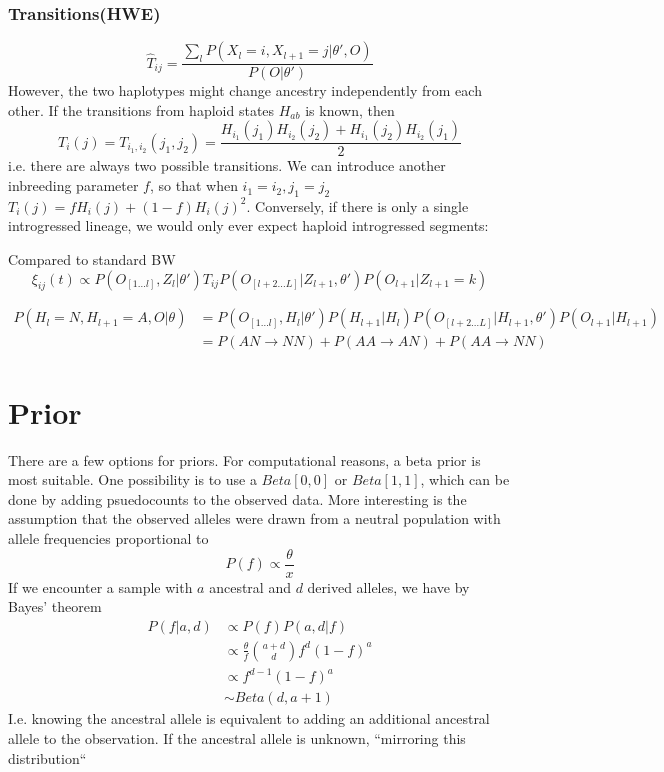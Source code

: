 \documentclass[10pt,a4paper]{article}
\begin{document}
\subsubsection{Transitions(HWE)}
$$\hat{T}_{ij} = \frac{\sum_l P(X_l=i, X_{l+1}=j| \theta', O)}{ P(O | \theta')}$$
However, the two haplotypes might change ancestry independently from each other. If the transitions from haploid states $H_{ab}$ is known, then 
$$T_i(j) = T_{i_1, i_2}(j_1, j_2) = \frac{H_{i_1}(j_1)H_{i_2}(j_2) + H_{i_1}(j_2)H_{i_2}(j_1)}{2}$$
i.e. there are always two possible transitions. We can introduce another inbreeding parameter $f$, so that when $i_1=i_2, j_1=j_2$ 
$T_i(j) = f H_i(j) + (1-f) H_i(j)^2$. Conversely, if there is only a single introgressed lineage, we would only ever expect haploid introgressed segments:



Compared to standard BW
$$\xi_{ij}(t) \propto P(O_{[1\dots l]}, Z_l | \theta') T_{ij}  P(O_{[l+2\dots L]}|Z_{l+1}, \theta') P(O_{l+1}|Z_{l+1}=k)$$

\begin{align}
P(H_l = N, H_{l+1} = A, O |\theta) &=  P(O_{[1\dots l]}, H_l | \theta') P(H_{l+1} | H_l) P(O_{[l+2\dots L]}|H_{l+1}, \theta') P(O_{l+1}|H_{l+1})\\
&=P(AN \to NN) + P(AA \to AN) + P(AA \to NN)
\end{align}

\section{Prior}
There are a few options for priors. For computational reasons, a beta prior is most suitable.
One possibility is to use a $Beta[0,0]$ or $Beta[1,1]$, which can be done by adding psuedocounts to the observed data.
More interesting is the assumption that the observed alleles were drawn from a neutral population with allele frequencies proportional to 
\begin{equation}
P(f) \propto \frac{\theta}{x}
\end{equation}
If we encounter a sample with $a$ ancestral and $d$ derived alleles, we have by Bayes' theorem
\begin{align}
P(f | a, d) &\propto P(f) P(a, d|f) \nonumber\\
 &\propto \frac{\theta}{f} \binom{a+d}{d} f^d (1-f)^a \nonumber\\
 &\propto f^{d-1} (1-f)^a \nonumber\\
&\sim Beta(d, a+1)
\end{align}
I.e. knowing the ancestral allele is equivalent to adding an additional ancestral allele to the observation. If the ancestral allele is unknown, ``mirroring this distribution``
\end{document}
